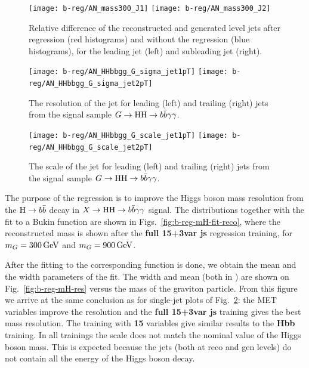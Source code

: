 \begin{figure}[h]
  \centering
  \texttt{[image: b-reg/AN\_mass300\_J1]}\hfil
  \texttt{[image: b-reg/AN\_mass300\_J2]}\hfil
  \caption{Relative \PT difference of the reconstructed and generated
    level jets after regression (red histograms) and without
    the regression (blue histograms), for the leading jet (left) and subleading jet (right).}
  \label{fig:b-reg-pt-res}
\end{figure}

\begin{figure}[h]
  \centering
  \texttt{[image: b-reg/AN\_HHbbgg\_G\_sigma\_jet1pT]}\hfil
  \texttt{[image: b-reg/AN\_HHbbgg\_G\_sigma\_jet2pT]}\hfil\\
  \caption{The resolution of the jet \PT for leading (left) and trailing (right) jets from the signal
    sample $G\to\mathrm{H}\mathrm{H}\to b\bar{b}\gamma\gamma$.}
  \label{fig:b-reg-jet-res}
\end{figure}
  
  \begin{figure}[h]
  \centering
  \texttt{[image: b-reg/AN\_HHbbgg\_G\_scale\_jet1pT]}\hfil
  \texttt{[image: b-reg/AN\_HHbbgg\_G\_scale\_jet2pT]}\hfil\\
  \caption{The scale of the jet \PT for leading (left) and trailing (right) jets from the signal
    sample $G\to\mathrm{H}\mathrm{H}\to b\bar{b}\gamma\gamma$.}
  \label{fig:b-reg-jet-scale}
\end{figure}

The purpose of the regression is to improve the Higgs boson mass resolution from the $\mathrm{H}\to b\bar{b}$ decay in $X\to\mathrm{H}\mathrm{H}\to b\bar{b}\gamma\gamma$ signal.  
The distributions together with the fit to a Bukin function are shown in Figs.~\ref{fig:b-reg-mH-fit-reco}, where the reconstructed mass is shown after the \textbf{full 15+3var js} regression training, for $m_G = 300\,\text{Ge\hspace{-.08em}V}$ and $m_G = 900\,\text{Ge\hspace{-.08em}V}$.

After the fitting to the corresponding function is done, we obtain the mean and the width parameters of the fit.  
The width and mean (both in \GeV) are shown on Fig.~\ref{fig:b-reg-mH-res} versus the mass of the graviton particle.  
From this figure we arrive at the same conclusion  as for single-jet plots of Fig.~\ref{fig:b-reg-jet-res}: the MET variables improve the resolution and the \textbf{full 15+3var js} training gives the best mass resolution. 
The training with \textbf{15} variables give similar results to the \textbf{Hbb} training.  
In all trainings the scale does not match the nominal value of the Higgs boson mass. 
This is expected because the jets (both at reco and gen levels) do not contain all the energy of the Higgs boson decay.


